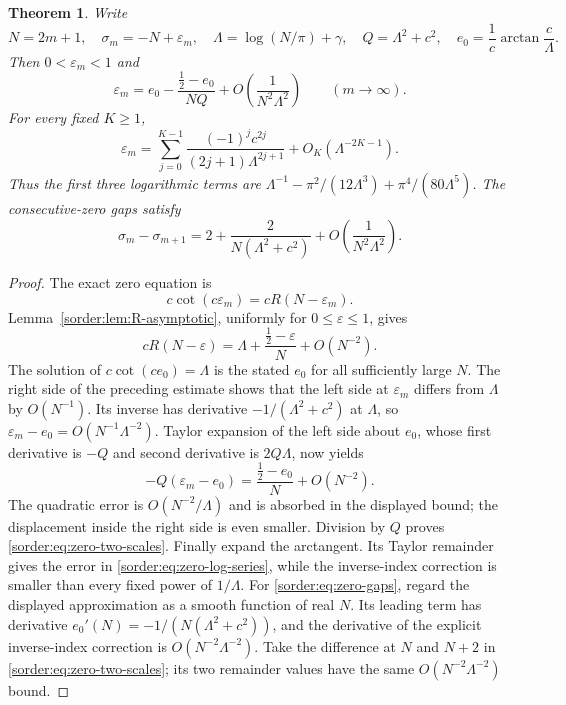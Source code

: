 \documentclass[11pt,a4paper]{article}
\newtheorem{theorem}{Theorem}[section]
\theoremstyle{definition}
\theoremstyle{remark}
\numberwithin{equation}{section}
\begin{document}
\begin{theorem}\label{sorder:thm:zero-asymptotic}
Write
\[
 N=2m+1,\quad \sigma_m=-N+\varepsilon_m,\quad
 \Lambda=\log(N/\pi)+\gamma,\quad Q=\Lambda^2+c^2,
 \quad e_0=\frac1c\arctan\frac c\Lambda.
\]
Then $0<\varepsilon_m<1$ and
\begin{equation}\label{sorder:eq:zero-two-scales}
 \varepsilon_m=e_0-
       \frac{\tfrac12-e_0}{NQ}
       +O\left(\frac1{N^2\Lambda^2}\right)
       \qquad(m\to\infty).
\end{equation}
For every fixed $K\ge1$,
\begin{equation}\label{sorder:eq:zero-log-series}
 \varepsilon_m=
 \sum_{j=0}^{K-1}\frac{(-1)^jc^{2j}}{(2j+1)\Lambda^{2j+1}}
       +O_K(\Lambda^{-2K-1}).
\end{equation}
Thus the first three logarithmic terms are
$\Lambda^{-1}-\pi^2/(12\Lambda^3)+\pi^4/(80\Lambda^5)$.
The consecutive-zero gaps satisfy
\begin{equation}\label{sorder:eq:zero-gaps}
 \sigma_m-\sigma_{m+1}
 =2+\frac{2}{N(\Lambda^2+c^2)}
       +O\left(\frac1{N^2\Lambda^2}\right).
\end{equation}
\end{theorem}
\begin{proof}
The exact zero equation is
\begin{equation}\label{sorder:eq:epsilon-equation}
 c\cot(c\varepsilon_m)=cR(N-\varepsilon_m).
\end{equation}
Lemma~\ref{sorder:lem:R-asymptotic}, uniformly for $0\le\varepsilon\le1$,
gives
\[
 cR(N-\varepsilon)
 =\Lambda+\frac{\tfrac12-\varepsilon}{N}+O(N^{-2}).
\]
The solution of $c\cot(ce_0)=\Lambda$ is the stated $e_0$ for all
sufficiently large $N$. The right side of the preceding estimate
shows that the left side at $\varepsilon_m$ differs from $\Lambda$
by $O(N^{-1})$. Its inverse has derivative
$-1/(\Lambda^2+c^2)$ at $\Lambda$, so
$\varepsilon_m-e_0=O(N^{-1}\Lambda^{-2})$.
Taylor expansion of the left side about $e_0$, whose first derivative
is $-Q$ and second derivative is $2Q\Lambda$, now yields
\[
 -Q(\varepsilon_m-e_0)
 =\frac{\tfrac12-e_0}{N}+O(N^{-2}).
\]
The quadratic error is $O(N^{-2}/\Lambda)$ and is absorbed in the
displayed bound; the displacement inside the right side is even
smaller. Division by $Q$ proves \eqref{sorder:eq:zero-two-scales}.
Finally expand the arctangent. Its Taylor remainder gives the error
in \eqref{sorder:eq:zero-log-series}, while the inverse-index correction
is smaller than every fixed power of $1/\Lambda$.
For \eqref{sorder:eq:zero-gaps}, regard the displayed approximation
as a smooth function of real $N$. Its leading term has derivative
$e_0'(N)=-1/(N(\Lambda^2+c^2))$, and the derivative of the explicit
inverse-index correction is $O(N^{-2}\Lambda^{-2})$.
Take the difference at $N$ and $N+2$ in
\eqref{sorder:eq:zero-two-scales}; its two remainder values have the
same $O(N^{-2}\Lambda^{-2})$ bound.
\end{proof}
\end{document}
